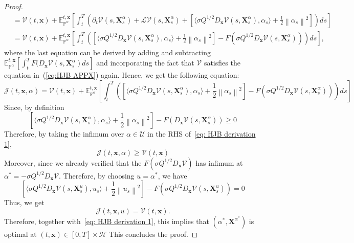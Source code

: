 \documentclass[nohyperref]{article}
\theoremstyle{plain}
\theoremstyle{remark}
\newcommand{\la}{\langle}
\newcommand{\ra}{\rangle}
\newcommand{\mc}{\mathcal}
\newcommand{\mb}{\mathbf}
\newcommand{\norm}[1]{\left\lVert#1\right\rVert}
\begin{document}
\begin{proof}
\begin{align}
    & = \mc{V}(t, \mb{x}) + \mathbb{E}_{\mathbb{P}^{\alpha}}^{t, \mb{x}}\left[\int_t^T \left(\partial_t \mc{V}(s, \mb{X}^{\alpha}_s) + \mc{L}\mc{V}(s, \mb{X}_s^{\alpha}) + \left[ \la \sigma Q^{1/2} D_{\mb{x}}\mc{V}(s, \mb{X}^{\alpha}_s), \alpha_s \ra + \frac{1}{2}\norm{\alpha_s}^2 \right] \right)ds\right]
    \nonumber \\
    & =  \mc{V}(t, \mb{x}) + \mathbb{E}_{\mathbb{P}^{\alpha}}^{t, \mb{x}}\left[\int_t^T \left(\left[ \la \sigma Q^{1/2} D_{\mb{x}}\mc{V}(s, \mb{X}^{\alpha}_s), \alpha_s \ra + \frac{1}{2}\norm{\alpha_s}^2\right] - F(\sigma Q^{1/2}D_{\mb{x}}\mc{V}(s, \mb{X}_s^{\alpha})) \right)ds\right],
\end{align}
where the last equation can be derived by adding and subtracting $\mathbb{E}_{\mathbb{P}^{\alpha}}^{t,\mb{x}} \left[ \int_t^T F(D_{\mb{x}}\mc{V}(s, \mb{X}_s^{\alpha}) ds \right]$ and incorporating the fact that $\mathcal{V}$ satisfies the equation in~(\ref{eq:HJB APPX}) again. Hence, we get the following equation:
\begin{equation}\label{eq: HJB derivation 1}
    \mathcal{J}(t, \mb{x}, \alpha) = \mc{V}(t, \mb{x}) + \mathbb{E}_{\mathbb{P}^{\alpha}}^{t, \mb{x}}\left[\int_t^T \left(\left[ \la  \sigma Q^{1/2}  D_{\mb{x}}\mc{V}(s, \mb{X}^{\alpha}_s), \alpha_s \ra + \frac{1}{2}\norm{\alpha_s}^2 \right] - F(\sigma Q^{1/2}D_{\mb{x}}\mc{V}(s, \mb{X}_s^{\alpha}))\right)ds\right]
\end{equation}
Since, by definition
\begin{equation}
    \left[ \la \sigma Q^{1/2} D_{\mb{x}}\mc{V}(s, \mb{X}^{\alpha}_s), \alpha_s \ra + \frac{1}{2}\norm{\alpha_s}^2 \right] 
 - F(D_{\mb{x}}\mc{V}(s, \mb{X}_s^{\alpha})) \geq  0
\end{equation}
Therefore, by taking the infimum over $\alpha \in \mc{U}$ in the RHS of~\eqref{eq: HJB derivation 1},
\begin{equation}
    \mathcal{J}(t, \mb{x}, \alpha) \geq \mc{V}(t, \mb{x})
\end{equation}
Moreover, since we already verified that the $F(\sigma Q^{1/2} D_{\mb{x}}\mc{V})$ has infimum at $\alpha^* = - \sigma Q^{1/2} D_{\mb{x}}\mc{V}$. Therefore, by choosing $u = \alpha^*$, we have
\begin{equation}
    \left[ \la  \sigma Q^{1/2} D_{\mb{x}}\mc{V}(s, \mb{X}^{u}_s), u_s \ra + \frac{1}{2}\norm{u_s}^2 \right] 
 - F( \sigma Q^{1/2} D_{\mb{x}}\mc{V}(s, \mb{X}_s^{u})) = 0
\end{equation}
Thus, we get
\begin{equation}
    \mathcal{J}(t, \mb{x}, u) = \mc{V}(t, \mb{x}).
\end{equation}
Therefore, together with~\eqref{eq: HJB derivation 1}, this implies that $(\alpha^{*}, \mb{X}^{\alpha^{*}})$ is optimal at $(t, \mb{x}) \in [0, T] \times \mc{H}$ This concludes the proof.
 \end{proof}
\end{document}
